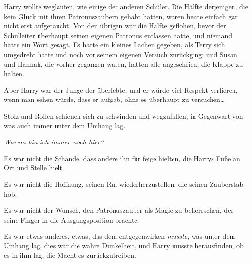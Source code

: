 Harry wollte weglaufen, wie einige der anderen Schüler. Die Hälfte derjenigen, die kein Glück mit ihren Patronuszaubern gehabt hatten, waren heute einfach gar nicht erst aufgetaucht. Von den übrigen war die Hälfte geflohen, bevor der Schulleiter überhaupt seinen eigenen Patronus entlassen hatte, und niemand hatte ein Wort gesagt. Es hatte ein kleines Lachen gegeben, als Terry sich umgedreht hatte und noch vor seinem eigenen Versuch zurückging; und Susan und Hannah, die vorher gegangen waren, hatten alle angeschrien, die Klappe zu halten.

Aber Harry war der Junge-der-überlebte, und er würde viel Respekt verlieren, wenn man sehen würde, dass er aufgab, ohne es überhaupt zu versuchen…

Stolz und Rollen schienen sich zu schwinden und wegzufallen, in Gegenwart von was auch immer unter dem Umhang lag.

\emph{Warum bin ich immer noch hier?}

Es war nicht die Schande, dass andere ihn für feige hielten, die Harrys Füße an Ort und Stelle hielt.

Es war nicht die Hoffnung, seinen Ruf wiederherzustellen, die seinen Zauberstab hob.

Es war nicht der Wunsch, den Patronuszauber als Magie zu beherrschen, der seine Finger in die Ausgangsposition brachte.

Es war etwas anderes, etwas, das dem entgegenwirken \emph{musste}, was unter dem Umhang lag, dies war die wahre Dunkelheit, und Harry musste herausfinden, ob es in ihm lag, die Macht es zurückzutreiben.

